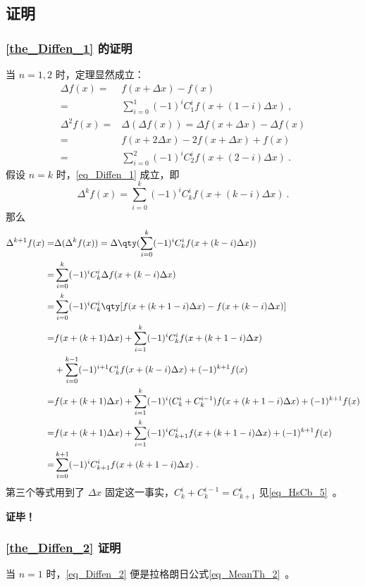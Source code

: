 \subsection{证明}
\subsubsection{\autoref{the_Diffen_1} 的证明}
当 $n=1,2$ 时，定理显然成立：
\begin{equation}
\begin{aligned}
\Delta f(x)=&f(x+\Delta x)-f(x)\\
=&\sum_{i=0}^1(-1)^iC_1^if(x+(1-i)\Delta x)~,\\
\Delta^2 f(x)=&\Delta (\Delta f(x))=\Delta f(x+\Delta x)-\Delta f(x)\\
=&f(x+2\Delta x)-2f(x+\Delta x)+f(x)\\
=&\sum_{i=0}^2(-1)^iC_2^if(x+(2-i)\Delta x)~.
\end{aligned}
\end{equation}
假设 $n=k$ 时，\autoref{eq_Diffen_1} 成立，即
\begin{equation}
\Delta^kf(x)=\sum_{i=0}^k(-1)^iC_k^if(x+(k-i)\Delta x)~.
\end{equation}
那么
\begin{equation}
\begin{aligned}
\Delta^{k+1} f(x)=&\Delta(\Delta^k f(x))=\Delta\qty(\sum_{i=0}^k(-1)^iC_k^if(x+(k-i)\Delta x))\\
=&\sum_{i=0}^k(-1)^iC_k^i\Delta f(x+(k-i)\Delta x)\\
=&\sum_{i=0}^k(-1)^iC_k^i\qty[f(x+(k+1-i)\Delta x)-f(x+(k-i)\Delta x)]\\
=&f(x+(k+1)\Delta x)+\sum_{i=1}^{k}(-1)^iC_k^if(x+(k+1-i)\Delta x)\\
&+\sum_{i=0}^{k-1}(-1)^{i+1}C_k^i f(x+(k-i)\Delta x)+(-1)^{k+1}f(x)\\
=&f(x+(k+1)\Delta x)+\sum_{i=1}^{k}(-1)^{i}(C_k^{i}+C_k^{i-1}) f(x+(k+1-i)\Delta x)+(-1)^{k+1}f(x)\\
=&f(x+(k+1)\Delta x)+\sum_{i=1}^{k}(-1)^{i}C_{k+1}^{i} f(x+(k+1-i)\Delta x)+(-1)^{k+1}f(x)\\
=&\sum_{i=0}^{k+1}(-1)^iC_{k+1}^if(x+(k+1-i)\Delta x)~.
\end{aligned}
\end{equation}
第三个等式用到了 $\Delta x$ 固定这一事实，$C_k^i+C_k^{i-1}=C_{k+1}^i$ 见\autoref{eq_HsCb_5}~。

\textbf{证毕！}
\subsubsection{\autoref{the_Diffen_2} 证明}
当 $n=1$ 时，\autoref{eq_Diffen_2} 便是拉格朗日公式\autoref{eq_MeanTh_2}~。

